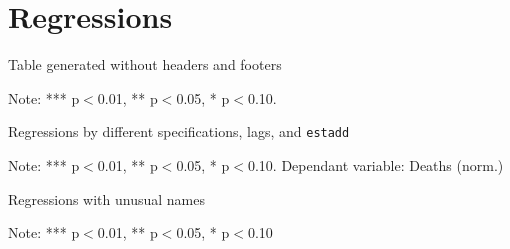 \documentclass[11pt]{article}
\numberwithin{table}{section}   %
\begin{document}

\clearpage
\section{Regressions} \label{sec:regressions}




\begin{table}[!htbp]
\caption*{Table generated without headers and footers} 

\centering


Note:  *** p$<$0.01, ** p$<$0.05, * p$<$0.10. 
\end{table}


\clearpage

\begin{table}[!htbp]
 \caption{Regressions by different specifications, lags, and \texttt{estadd}} \label{reg2}
 \begin{center}

\resizebox{1\textwidth}{!}{
 
 }


\end{center}
\small{Note:  *** p$<$0.01, ** p$<$0.05, * p$<$0.10. Dependant variable: Deaths (norm.)} 
\end{table}



\clearpage

\begin{table}[!htbp]
 \caption{Regressions with unusual names} \label{reg3}
\centering
 

\small{Note:  *** p$<$0.01, ** p$<$0.05, * p$<$0.10} 
\end{table}

\vfill


\end{document}
